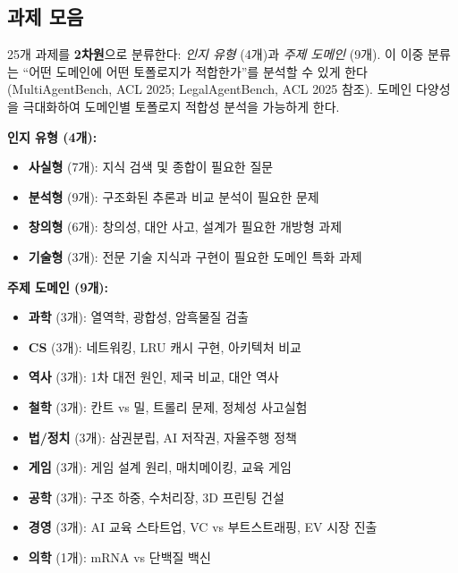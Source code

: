 \documentclass[a4paper,11pt]{article}
\begin{document}
\subsection{과제 모음}

25개 과제를 \textbf{2차원}으로 분류한다: \emph{인지 유형} (4개)과 \emph{주제 도메인} (9개). 이 이중 분류는 ``어떤 도메인에 어떤 토폴로지가 적합한가''를 분석할 수 있게 한다 (MultiAgentBench, ACL 2025; LegalAgentBench, ACL 2025 참조). 도메인 다양성을 극대화하여 도메인별 토폴로지 적합성 분석을 가능하게 한다.

\textbf{인지 유형 (4개):}
\begin{itemize}
    \item \textbf{사실형} (7개): 지식 검색 및 종합이 필요한 질문
    \item \textbf{분석형} (9개): 구조화된 추론과 비교 분석이 필요한 문제
    \item \textbf{창의형} (6개): 창의성, 대안 사고, 설계가 필요한 개방형 과제
    \item \textbf{기술형} (3개): 전문 기술 지식과 구현이 필요한 도메인 특화 과제
\end{itemize}

\textbf{주제 도메인 (9개):}
\begin{itemize}
    \item \textbf{과학} (3개): 열역학, 광합성, 암흑물질 검출
    \item \textbf{CS} (3개): 네트워킹, LRU 캐시 구현, 아키텍처 비교
    \item \textbf{역사} (3개): 1차 대전 원인, 제국 비교, 대안 역사
    \item \textbf{철학} (3개): 칸트 vs 밀, 트롤리 문제, 정체성 사고실험
    \item \textbf{법/정치} (3개): 삼권분립, AI 저작권, 자율주행 정책
    \item \textbf{게임} (3개): 게임 설계 원리, 매치메이킹, 교육 게임
    \item \textbf{공학} (3개): 구조 하중, 수처리장, 3D 프린팅 건설
    \item \textbf{경영} (3개): AI 교육 스타트업, VC vs 부트스트래핑, EV 시장 진출
    \item \textbf{의학} (1개): mRNA vs 단백질 백신
\end{itemize}
\end{document}
